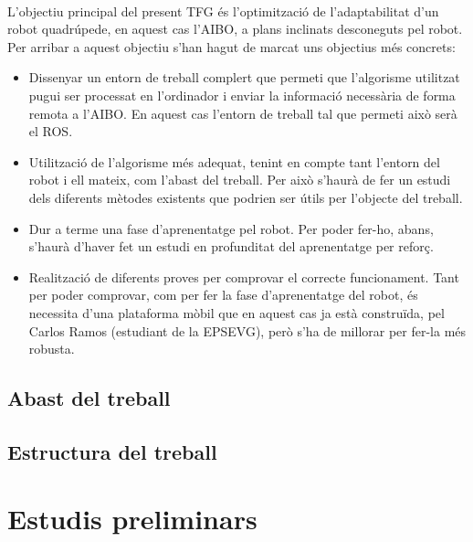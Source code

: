 \documentclass[12pt,a4paper,final,twoside]{article}
\begin{document}
\paragraph{}L'objectiu principal del present TFG és l'optimització de l'adaptabilitat d'un robot quadrúpede, en aquest cas l'AIBO, a plans inclinats desconeguts pel robot. Per arribar a aquest objectiu s'han hagut de marcat uns objectius més concrets:
\begin{itemize}
\item Dissenyar un entorn de treball complert que permeti que l'algorisme utilitzat pugui ser processat en l'ordinador i enviar la informació necessària de forma remota a l'AIBO. En aquest cas l'entorn de treball tal que permeti això serà el ROS.
\item Utilització de l'algorisme més adequat, tenint en compte tant l'entorn del robot i ell mateix, com l'abast del treball. Per això s'haurà de fer un estudi dels diferents mètodes existents que podrien ser útils per l'objecte del treball.
\item Dur a terme una fase d'aprenentatge pel robot. Per poder fer-ho, abans, s'haurà d'haver fet un estudi en profunditat del aprenentatge per reforç.
\item Realització de diferents proves per comprovar el correcte funcionament. Tant per poder comprovar, com per fer la fase d'aprenentatge del robot, és necessita d'una plataforma mòbil que en aquest cas ja està construïda, pel Carlos Ramos (estudiant de la EPSEVG)\cite{TFG_Carlos_Ramos}, però s'ha de millorar per fer-la més robusta.
\end{itemize}


\label{Abast}
\subsection*{Abast del treball}

\label{Estructura}
\subsection*{Estructura del treball}

\newpage

\label{Estudis-preliminars}
\section{Estudis preliminars}
\end{document}
